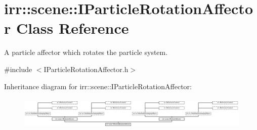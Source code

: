 \hypertarget{classirr_1_1scene_1_1IParticleRotationAffector}{}\section{irr\+:\+:scene\+:\+:I\+Particle\+Rotation\+Affector Class Reference}
\label{classirr_1_1scene_1_1IParticleRotationAffector}


A particle affector which rotates the particle system.  




{\ttfamily \#include $<$I\+Particle\+Rotation\+Affector.\+h$>$}

Inheritance diagram for irr\+:\+:scene\+:\+:I\+Particle\+Rotation\+Affector\+:\begin{figure}[H]
\begin{center}
\leavevmode
\includegraphics[height=1.620370cm]{classirr_1_1scene_1_1IParticleRotationAffector}
\end{center}
\end{figure}
